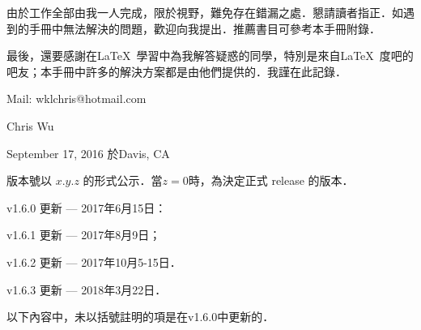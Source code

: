 由於工作全部由我一人完成，限於視野，難免存在錯漏之處．懇請讀者指正．如遇到的手冊中無法解決的問題，歡迎向我提出．推薦書目可參考本手冊附錄．

最後，還要感謝在\LaTeX\ 學習中為我解答疑惑的同學，特別是來自\LaTeX\ 度吧的吧友；本手冊中許多的解決方案都是由他們提供的．我謹在此記錄．

\vfill

\begin{flushright}
Mail: wklchris@hotmail.com\dpar

Chris Wu

September 17, 2016 於Davis, CA
\end{flushright}
\clearpage
{}\dpar\dpar

版本號以 $x.y.z$ 的形式公示．當$z=0$時，為決定正式 release 的版本．

v1.6.0 更新 --- 2017年6月15日：

v1.6.1 更新 --- 2017年8月9日；

v1.6.2 更新 --- 2017年10月5-15日．

v1.6.3 更新 --- 2018年3月22日．\dpar

以下內容中，未以括號註明的項是在v1.6.0中更新的．

